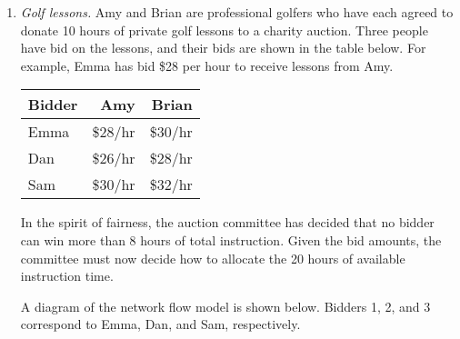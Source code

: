 \begin{enumerate}
\begin{solution}
\end{solution}

\item \emph{Golf lessons.}  Amy and Brian are professional
  golfers who have each agreed to donate 10 hours of private golf
  lessons to a charity auction. Three people have bid on the lessons,
  and their bids are shown in the table below. For example, Emma has
  bid \$28 per hour to receive lessons from Amy.

\begin{tabular}{lrr}
Bidder & Amy & Brian \\ \hline
Emma & \$28/hr & \$30/hr \\
Dan     & \$26/hr & \$28/hr \\
Sam  & \$30/hr & \$32/hr
\end{tabular}

In the spirit of fairness, the auction committee has decided that no bidder can win 
more than 8 hours of total instruction. Given the bid amounts, the committee must now
decide how to allocate the 20 hours of available instruction time.

\begin{solution}
  \bs A diagram of the network flow model is shown below. Bidders 1, 2,
  and 3 correspond to Emma, Dan, and Sam, respectively.
\vspace{.2in}
\begin{center}
\end{center}
\end{solution}
\end{enumerate}
